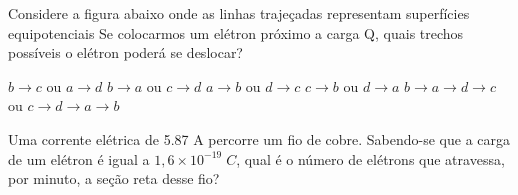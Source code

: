 \documentclass[12pt, addpoints]{exam}
\begin{document}
    \begin{questions}
\begin{multicols*}{2}
\question Considere a figura abaixo onde as linhas trajeçadas representam superfícies equipotenciais Se colocarmos um elétron próximo a carga Q, quais trechos possíveis o elétron poderá se deslocar?
        
        \begin{center}
            \begin{minipage}[c]{0.5\linewidth}
            \end{minipage}
        \end{center}
        
        

\begin{choices}
\choice $b\rightarrow c$ ou $a\rightarrow d$ 
\choice $b\rightarrow a$ ou $c\rightarrow d$ 
\choice $a\rightarrow b$ ou $d\rightarrow c$ 
\choice $c\rightarrow b$ ou $d\rightarrow a$ 
\choice $b\rightarrow a\rightarrow d\rightarrow c$ ou $c\rightarrow d\rightarrow a\rightarrow b$ 
\end{choices}
\question Uma corrente elétrica de    5.87 A percorre um ﬁo de cobre. Sabendo-se que a carga de um elétron é igual a $1,6\times 10^{-19}\;C$, qual é o número de elétrons que atravessa, por minuto, a seção reta desse ﬁo?


\end{multicols*}
\end{questions}
\end{document}
